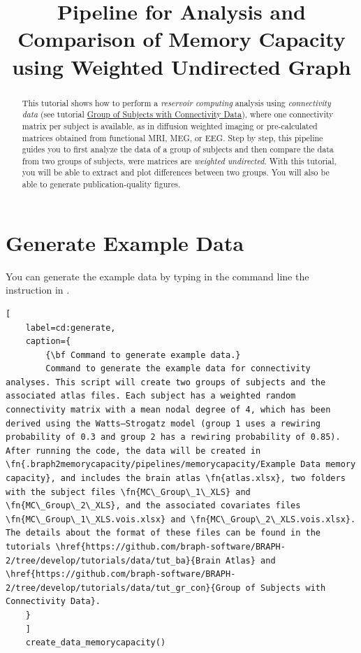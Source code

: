 \documentclass[justified]{tufte-handout}
\title[Analysis and Comparison of Memory Capacity WU]{Pipeline for Analysis and Comparison of Memory Capacity using Weighted Undirected Graph}
\begin{document}
\maketitle

\begin{abstract}
\noindent
This tutorial shows how to perform a \emph{reservoir computing} analysis using \emph{connectivity data} (see tutorial \href{https://github.com/braph-software/BRAPH-2/tree/develop/tutorials/data/tut_gr_con}{Group of Subjects with Connectivity Data}), where one connectivity matrix per subject is available, as in diffusion weighted imaging or pre-calculated matrices obtained from functional MRI, MEG, or EEG. Step by step, this pipeline guides you to first analyze the data of a group of subjects and then compare the data from two groups of subjects, were matrices are \emph{weighted undirected}.  With this tutorial, you will be able to extract and plot differences between two groups. You will also be able to generate publication-quality figures.
\end{abstract}

\tableofcontents

\clearpage
\section{Generate Example Data}

You can generate the example data by typing in the command line the instruction in .

\begin{lstlisting}[
	label=cd:generate,
	caption={
		{\bf Command to generate example data.}
		Command to generate the example data for connectivity analyses. This script will create two groups of subjects and the associated atlas files. Each subject has a weighted random connectivity matrix with a mean nodal degree of 4, which has been derived using the Watts–Strogatz model (group 1 uses a rewiring probability of 0.3 and group 2 has a rewiring probability of 0.85). After running the code, the data will be created in \fn{.braph2memorycapacity/pipelines/memorycapacity/Example Data memory capacity}, and includes the brain atlas \fn{atlas.xlsx}, two folders with the subject files \fn{MC\_Group\_1\_XLS} and \fn{MC\_Group\_2\_XLS}, and the associated covariates files \fn{MC\_Group\_1\_XLS.vois.xlsx} and \fn{MC\_Group\_2\_XLS.vois.xlsx}. The details about the format of these files can be found in the tutorials \href{https://github.com/braph-software/BRAPH-2/tree/develop/tutorials/data/tut_ba}{Brain Atlas} and \href{https://github.com/braph-software/BRAPH-2/tree/develop/tutorials/data/tut_gr_con}{Group of Subjects with Connectivity Data}.
	}
	]
	create_data_memorycapacity()
\end{lstlisting}
\end{document}
